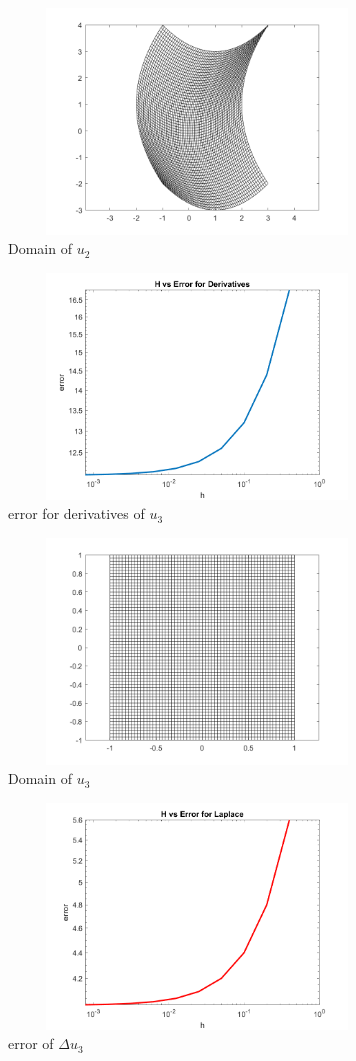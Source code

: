 \documentclass[12pt]{article}
\begin{document}
	    \begin{figure}
	    	\centering
	    	\includegraphics[width=100mm,height=60mm]{function2.png}
	    	\caption{Domain of $u_2$}
	    \end{figure}
    	\begin{figure}
    		\centering
    		\includegraphics[width=100mm,height=60mm]{error3.png}
    		\caption{error for derivatives of $u_3$}
    	\end{figure}
        \begin{figure}
        	\centering
        	\includegraphics[width=100mm,height=60mm]{function3.png}
        	\caption{Domain of $u_3$}
        \end{figure}
        \begin{figure}
        	\centering
        	\includegraphics[width=100mm,height=60mm]{errorLaplace3.png}
        	\caption{error of $\Delta u_3$}
        \end{figure}
        \pagebreak
    	
\end{document}
